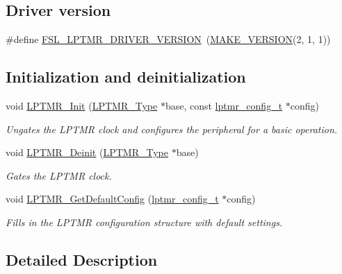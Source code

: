 \subsection*{Driver version}
\begin{DoxyCompactItemize}
\item 
\#define \mbox{\hyperlink{group__lptmr_ga2418e533da0b331dbcc7b04ebf90b54e}{F\+S\+L\+\_\+\+L\+P\+T\+M\+R\+\_\+\+D\+R\+I\+V\+E\+R\+\_\+\+V\+E\+R\+S\+I\+ON}}~(\mbox{\hyperlink{group__ftfx__utilities_ga812138aa3315b0c6953c1a26130bcc37}{M\+A\+K\+E\+\_\+\+V\+E\+R\+S\+I\+ON}}(2, 1, 1))
\end{DoxyCompactItemize}
\subsection*{Initialization and deinitialization}
\begin{DoxyCompactItemize}
\item 
void \mbox{\hyperlink{group__lptmr_ga1f2e64506623dc66e329e136931b4e25}{L\+P\+T\+M\+R\+\_\+\+Init}} (\mbox{\hyperlink{struct_l_p_t_m_r___type}{L\+P\+T\+M\+R\+\_\+\+Type}} $\ast$base, const \mbox{\hyperlink{group__lptmr_gad0d6720b03ee0674c139c7b9bb3d0419}{lptmr\+\_\+config\+\_\+t}} $\ast$config)
\begin{DoxyCompactList}\small\item\em Ungates the L\+P\+T\+MR clock and configures the peripheral for a basic operation. \end{DoxyCompactList}\item 
void \mbox{\hyperlink{group__lptmr_ga2436bf246a0aab4a0191d059b80ff088}{L\+P\+T\+M\+R\+\_\+\+Deinit}} (\mbox{\hyperlink{struct_l_p_t_m_r___type}{L\+P\+T\+M\+R\+\_\+\+Type}} $\ast$base)
\begin{DoxyCompactList}\small\item\em Gates the L\+P\+T\+MR clock. \end{DoxyCompactList}\item 
void \mbox{\hyperlink{group__lptmr_ga11a8100adcd8f9f0cf167b2d84a51d11}{L\+P\+T\+M\+R\+\_\+\+Get\+Default\+Config}} (\mbox{\hyperlink{group__lptmr_gad0d6720b03ee0674c139c7b9bb3d0419}{lptmr\+\_\+config\+\_\+t}} $\ast$config)
\begin{DoxyCompactList}\small\item\em Fills in the L\+P\+T\+MR configuration structure with default settings. \end{DoxyCompactList}\end{DoxyCompactItemize}


\subsection{Detailed Description}


